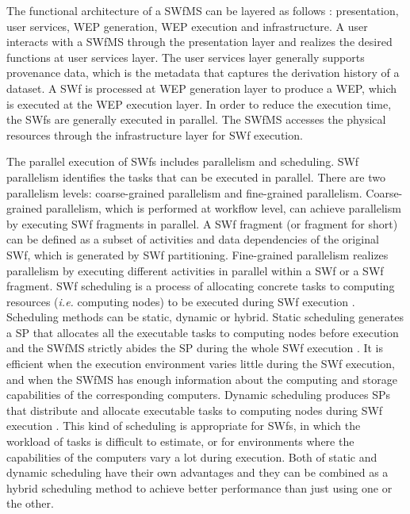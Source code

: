 The functional architecture of a SWfMS can be layered as follows \cite{Deelman2005,Zhao2007,Altintas2004,Ogasawara2013}:
presentation, user services, WEP generation, WEP execution
and infrastructure. A user interacts with a SWfMS through the presentation layer
and realizes the desired functions at user services layer. 
The user services layer generally supports provenance data, which is the metadata that captures the derivation history of a dataset.
A SWf is processed at WEP generation layer to produce a WEP, which is executed at the WEP execution layer.
In order to reduce the execution time, the SWfs are generally executed in parallel.
The SWfMS accesses the physical resources through the infrastructure layer for SWf execution.

The parallel execution of SWfs includes parallelism and scheduling. SWf parallelism identifies the tasks that can be executed in parallel. There are two parallelism levels: coarse-grained parallelism and fine-grained parallelism.
Coarse-grained parallelism, which is performed at workflow level, can achieve parallelism by executing SWf fragments in parallel. A SWf fragment (or fragment for short) can be defined as a subset of activities and data dependencies of the original SWf, which is generated by SWf partitioning. Fine-grained parallelism realizes parallelism by executing different activities in parallel within a SWf or a SWf fragment. SWf scheduling is a process of allocating concrete tasks to computing resources (\textit{i.e.} computing nodes) to be executed during SWf execution \cite{Bux2013}. Scheduling methods can be static, dynamic or hybrid. Static scheduling generates a SP that allocates all the executable tasks to computing nodes before execution and the SWfMS strictly abides the SP during the whole SWf execution \cite{Bux2013}. It is efficient when the execution environment varies little during the SWf execution, and when the SWfMS has enough information about the computing and storage capabilities of the corresponding computers. Dynamic scheduling produces SPs that distribute and allocate executable tasks to computing nodes during SWf execution \cite{Bux2013}.
This kind of scheduling is appropriate for SWfs, in which the workload of tasks is difficult to estimate, or for environments where the capabilities of the computers vary a lot during execution. Both of static and dynamic scheduling have their own advantages
and they can be combined as a hybrid scheduling method to achieve better performance
than just using one or the other.

